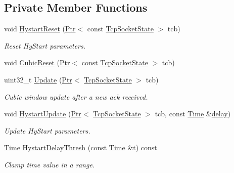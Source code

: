 \subsection*{Private Member Functions}
\begin{DoxyCompactItemize}
\item 
void \hyperlink{classns3_1_1TcpCubic_a041ef065895769c50cfc02d39372d08d}{Hystart\+Reset} (\hyperlink{classns3_1_1Ptr}{Ptr}$<$ const \hyperlink{classns3_1_1TcpSocketState}{Tcp\+Socket\+State} $>$ tcb)
\begin{DoxyCompactList}\small\item\em Reset Hy\+Start parameters. \end{DoxyCompactList}\item 
void \hyperlink{classns3_1_1TcpCubic_ad27735b7798af17915ad35602fbe996b}{Cubic\+Reset} (\hyperlink{classns3_1_1Ptr}{Ptr}$<$ const \hyperlink{classns3_1_1TcpSocketState}{Tcp\+Socket\+State} $>$ tcb)
\item 
uint32\+\_\+t \hyperlink{classns3_1_1TcpCubic_a1676df929585823efe488c35448c69e4}{Update} (\hyperlink{classns3_1_1Ptr}{Ptr}$<$ \hyperlink{classns3_1_1TcpSocketState}{Tcp\+Socket\+State} $>$ tcb)
\begin{DoxyCompactList}\small\item\em Cubic window update after a new ack received. \end{DoxyCompactList}\item 
void \hyperlink{classns3_1_1TcpCubic_ac32cb45bced2f370fe530e307414fb3b}{Hystart\+Update} (\hyperlink{classns3_1_1Ptr}{Ptr}$<$ \hyperlink{classns3_1_1TcpSocketState}{Tcp\+Socket\+State} $>$ tcb, const \hyperlink{classns3_1_1Time}{Time} \&\hyperlink{mmwave_2model_2fading-traces_2fading__trace__generator_8m_a7964e6aa8f61a9d28973c8267a606ad8}{delay})
\begin{DoxyCompactList}\small\item\em Update Hy\+Start parameters. \end{DoxyCompactList}\item 
\hyperlink{classns3_1_1Time}{Time} \hyperlink{classns3_1_1TcpCubic_a3c752c5abf71c05783fb947910239902}{Hystart\+Delay\+Thresh} (const \hyperlink{classns3_1_1Time}{Time} \&t) const 
\begin{DoxyCompactList}\small\item\em Clamp time value in a range. \end{DoxyCompactList}\end{DoxyCompactItemize}
